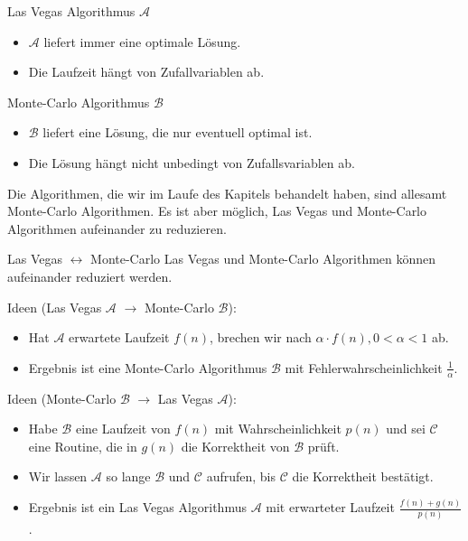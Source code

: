\documentclass{panikzettel}
\begin{document}
\begin{halfboxl}
\vspace{-\baselineskip}
\begin{defi}{Las Vegas Algorithmus $\mathcal{A}$}
\begin{itemize}
    \item $\mathcal{A}$ liefert immer eine optimale Lösung.
    \item Die Laufzeit hängt von Zufallvariablen ab.
\end{itemize}
\end{defi}
\end{halfboxl}%
\begin{halfboxr}
\vspace{-\baselineskip}
\begin{defi}{Monte-Carlo Algorithmus $\mathcal{B}$}
\begin{itemize}
    \item $\mathcal{B}$ liefert eine Lösung, die nur eventuell optimal ist.
    \item Die Lösung hängt nicht unbedingt von Zufallsvariablen ab.
\end{itemize}
\end{defi}
\end{halfboxr}

Die Algorithmen, die wir im Laufe des Kapitels behandelt haben, sind allesamt Monte-Carlo Algorithmen. Es ist aber möglich, Las Vegas und Monte-Carlo Algorithmen aufeinander zu reduzieren.

\begin{theo}{Las Vegas $\leftrightarrow$ Monte-Carlo}
Las Vegas und Monte-Carlo Algorithmen können aufeinander reduziert werden.
\end{theo}

Ideen (Las Vegas $\mathcal{A}$ $\to$ Monte-Carlo $\mathcal{B}$):
\begin{itemize}
    \item Hat $\mathcal{A}$ erwartete Laufzeit $f(n)$, brechen wir nach $\alpha \cdot f(n), 0 < \alpha < 1$ ab.
    \item Ergebnis ist eine Monte-Carlo Algorithmus $\mathcal{B}$ mit Fehlerwahrscheinlichkeit $\frac{1}{\alpha}$.
\end{itemize}

Ideen (Monte-Carlo $\mathcal{B}$ $\to$ Las Vegas $\mathcal{A}$):
\begin{itemize}
    \item Habe $\mathcal{B}$ eine Laufzeit von $f(n)$ mit Wahrscheinlichkeit $p(n)$ und sei $\mathcal{C}$ eine Routine, die in $g(n)$ die Korrektheit von $\mathcal{B}$ prüft.
    \item Wir lassen $\mathcal{A}$ so lange $\mathcal{B}$ und $\mathcal{C}$ aufrufen, bis $\mathcal{C}$ die Korrektheit bestätigt.
    \item Ergebnis ist ein Las Vegas Algorithmus $\mathcal{A}$ mit erwarteter Laufzeit $\frac{f(n)+g(n)}{p(n)}$.
\end{itemize}
\end{document}
